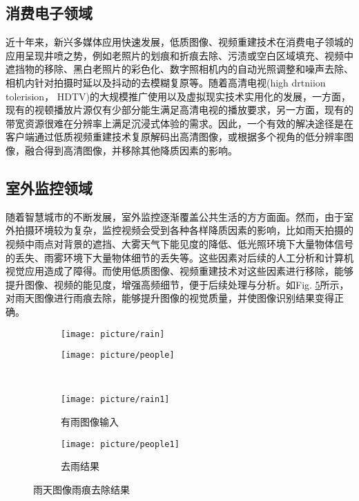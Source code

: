\documentclass[letterpaper,10pt]{article}
\begin{document}
		\subsection{消费电子领域}
		
		近十年来，新兴多媒体应用快速发展，低质图像、视频重建技术在消费电子领城的应用呈现井喷之势，例如老照片的划痕和折痕去除、污渍或空白区域填充、视频中遮挡物的移除、黑白老照片的彩色化、数字照相机内的自动光照调整和噪声去除、相机内针对拍摄时延以及抖动的去模糊复原等。随着高清电视(high drtniion tolerision， HDTV)的大规模推广使用以及虚拟现实技术实用化的发展，一方面，现有的视顿播放片源仅有少部分能生满足高清电视的播放要求，另一方面，现有的带宽资源很难在分辨率上满足沉浸式体验的需求。因此，一个有效的解决途径是在客户端通过低质视频重建技术复原解码出高清图像，或根据多个视角的低分辨率图像，融合得到高清图像，并移除其他降质因素的影响。
	
		\subsection{室外监控领域}
		
		随着智慧城市的不断发展，室外监控逐渐覆盖公共生活的方方面面。然而，由于室外拍摄环境较为复杂，监控视频会受到各种各样降质因素的影响，比如雨天拍摄的视频中雨点对背景的遮挡、大雾天气下能见度的降低、低光照环境下大量物体信号的丢失、雨雾环境下大量物体细节的丢失等。这些因素对后续的人工分析和计算机视觉应用造成了障得。而使用低质图像、视频重建技术对这些因素进行移除，能够提升图像、视频的能见度，增强高频细节，便于后续处理与分析。如Fig. \ref{fig: Rainy image marks}所示，对雨天图像进行雨痕去除，能够提升图像的视觉质量，并使图像识别结果变得正确。
	
		\begin{figure}[htbp] 
		\centering 
		
		\begin{subfigure}{0.4\textwidth}
			\texttt{[image: picture/rain]}
			\captionsetup{font=scriptsize}
			\label{fig:rain}
		\end{subfigure}
		\begin{subfigure}{0.4\textwidth}
			\texttt{[image: picture/people]}
			\captionsetup{font=scriptsize}
			\label{fig:people}
		\end{subfigure}\\
		\begin{subfigure}{0.4\textwidth}
			\texttt{[image: picture/rain1]}
			\captionsetup{font=scriptsize}
			\caption{有雨图像输入}
			\label{fig:rain1}	
		\end{subfigure}
		\begin{subfigure}{0.4\textwidth}
			\texttt{[image: picture/people1]}
			\captionsetup{font=scriptsize}
			\caption{去雨结果}
			\label{fig:people1}
		\end{subfigure}
		\captionsetup{font=scriptsize}
		\caption{
			\label{fig: Rainy image marks}
			雨天图像雨痕去除结果 \cite{yang2017deep}
		}
	    \end{figure}
	
\end{document}
